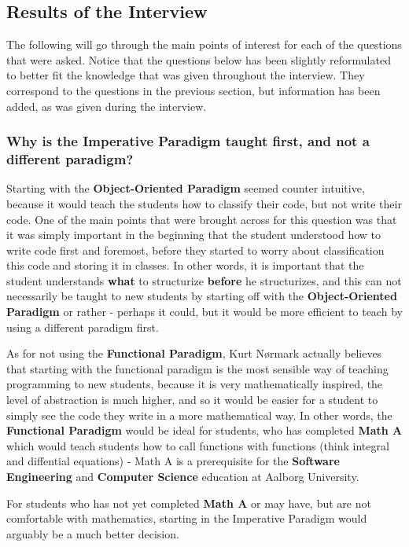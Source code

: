 \subsection{Results of the Interview}

The following will go through the main points of interest for each of the questions that were asked. Notice that the questions below has been slightly 
reformulated to better fit the knowledge that was given throughout the interview. They correspond to the questions in the previous section, but 
information has been added, as was given during the interview.

\subsubsection{Why is the Imperative Paradigm taught first, and not a different paradigm?}

Starting with the \textbf{Object-Oriented Paradigm} seemed counter intuitive, because it would teach the students how to classify their code, but not 
write their code. One of the main points that were brought across for this question was that it was simply important in the beginning that the student 
understood how to write code first and foremost, before they started to worry about classification this code and storing it in classes. In other words, 
it is important that the student understands \textbf{what} to structurize \textbf{before} he structurizes, and this can not necessarily be taught to 
new students by starting off with the \textbf{Object-Oriented Paradigm} or rather - perhaps it could, but it would be more efficient to teach by using 
a different paradigm first. 


As for not using the \textbf{Functional Paradigm}, Kurt N{\o}rmark actually believes that starting with the functional paradigm is the most sensible 
way of teaching programming to new students, because it is very mathematically inspired, the level of abstraction is much higher, and so it would be 
easier for a student to simply see the code they write in a more mathematical way. In other words, the \textbf{Functional Paradigm} would be ideal for 
students, who has completed \textbf{Math A} which would teach students how to call functions with functions (think integral and diffential equations) - 
Math A is a prerequisite for the \textbf{Software Engineering} and \textbf{Computer Science} education at Aalborg University.


For students who has not yet completed \textbf{Math A} or may have, but are not comfortable with mathematics, starting in the Imperative Paradigm would 
arguably be a much better decision.


